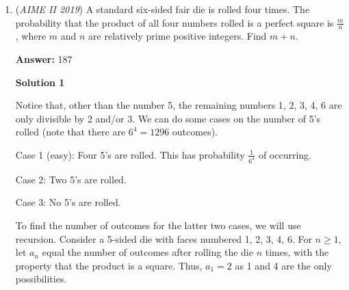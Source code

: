 \begin{enumerate}
\textbf{Solution 3}

$c|70,71$ and $\gcd(70,71)=1$, so $c=1$. By similar logic, we find that $e=1$. $\newline$ Since $c=e=1$, the number of solutions is the number of factors of $70$ multiplied by the number of factors of $72$. $70=2^1 \times 5^1 \times7^1$, giving $(1+1)^3=8$ factors. $72=2^3 \times 3^2$, giving $(3+1)\times(2+1)=12$ factors. $\newline$ Thus, the final answer is $8\times12=\boxed{96}$. $\newline$ ~pandapower24

 



\textbf{Solution 4}

We find that that $c$ must be $1$,$d$ must be $71$, and $e$ must be 1. We see that we now just have to pick factor pairs for $a,b$ as well as $f,g$. $fg=72$, and $ab=70$. There are $8$ choices for $a$ and $12$ choices for $f$. Whenever we choose a factor for either $a$ or $b$, the second letter is forced; therefore, our answer is $8*12=\boxed{096}$.~jamespudi

 


	\item (\textit{AIME II 2019}) A standard six-sided fair die is rolled four times. The probability that the product of all four numbers rolled is a perfect square is $\frac{m}{n}$, where $m$ and $n$ are relatively prime positive integers. Find $m+n$.


 
 \textbf{Answer: }187



\textbf{Solution 1}

Notice that, other than the number 5, the remaining numbers 1, 2, 3, 4, 6 are only divisible by 2 and/or 3. We can do some cases on the number of 5's rolled (note that there are $6^4 = 1296$ outcomes).

 Case 1 (easy): Four 5's are rolled. This has probability $\frac{1}{6^4}$ of occurring.

 Case 2: Two 5's are rolled.

 Case 3: No 5's are rolled.

 To find the number of outcomes for the latter two cases, we will use recursion. Consider a 5-sided die with faces numbered 1, 2, 3, 4, 6. For $n \ge 1$, let $a_n$ equal the number of outcomes after rolling the die $n$ times, with the property that the product is a square. Thus, $a_1 = 2$ as 1 and 4 are the only possibilities.


\end{enumerate}
